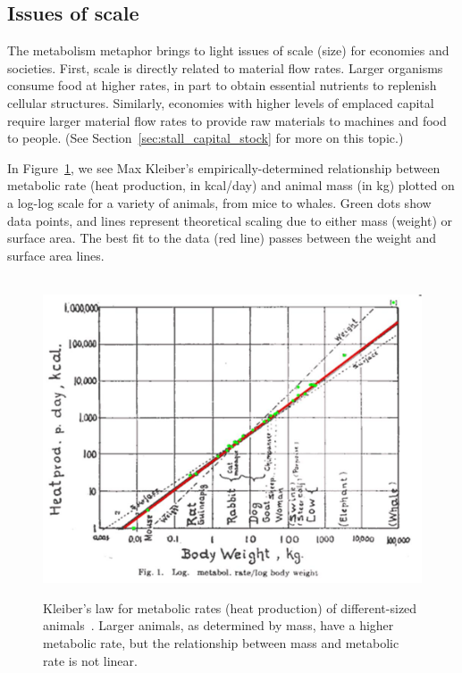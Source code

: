 \subsection{Issues of scale}
\label{sec:metabolic_scale}

The metabolism metaphor brings to light issues of scale (size)
for economies and societies.
First, scale is directly related to material flow rates.
Larger organisms consume food at higher rates,
in part to obtain essential nutrients to replenish cellular structures.
Similarly, economies with higher levels of emplaced capital
require larger material flow rates to provide 
raw materials to machines and food to people.
(See Section~\ref{sec:stall_capital_stock} for more on this topic.)

In Figure~\ref{fig:Kleiber_law},
we see Max Kleiber's empirically-determined relationship between
metabolic rate (heat production, in kcal/day) and
animal mass (in kg)
plotted on a log-log scale
for a variety of animals,
from mice to whales.
Green dots show data points, and
lines represent theoretical scaling due to either mass (weight)
or surface area.
The best fit to the data (red line)
passes between the weight and surface area lines.

\begin{figure}[!ht]
\centering\
\includegraphics[width=\linewidth]{Part_0/Chapter_Acct_For_WoN/images/Kleiber1947.jpg}
\caption[Kleiber's law for metabolic rates of animals]{Kleiber's law 
for metabolic rates (heat production) of different-sized animals~\cite[p.530]{Kleiber1947}.
Larger animals, as determined by mass, have a higher metabolic rate, 
but the relationship between mass and metabolic rate is not linear.}
\label{fig:Kleiber_law}
\end{figure}

